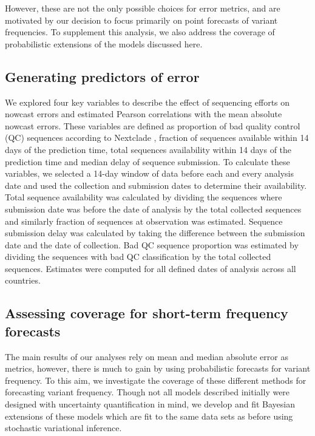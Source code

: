 \documentclass[10pt,letterpaper]{article}
\begin{document}
However, these are not the only possible choices for error metrics, and are motivated by our decision to focus primarily on point forecasts of variant frequencies.
To supplement this analysis, we also address the coverage of probabilistic extensions of the models discussed here.

\subsection*{Generating predictors of error}

We explored four key variables to describe the effect of sequencing efforts on nowcast errors and estimated Pearson correlations with the mean absolute nowcast errors.
These variables are defined as proportion of bad quality control (QC) sequences according to Nextclade \cite{aksamentov2021nextclade}, fraction of sequences available within 14 days of the prediction time, total sequences availability within 14 days of the prediction time and median delay of sequence submission.
To calculate these variables, we selected a 14-day window of data before each and every analysis date and used the collection and submission dates to determine their availability.
Total sequence availability was calculated by dividing the sequences where submission date was before the date of analysis by the total collected sequences and similarly fraction of sequences at observation was estimated.
Sequence submission delay was calculated by taking the difference between the submission date and the date of collection.
Bad QC sequence proportion was estimated by dividing the sequences with bad QC classification by the total collected sequences.
Estimates were computed for all defined dates of analysis across all countries.

\subsection*{Assessing coverage for short-term frequency forecasts}

The main results of our analyses rely on mean and median absolute error as metrics, however, there is much to gain by using probabilistic forecasts for variant frequency.
To this aim, we investigate the coverage of these different methods for forecasting variant frequency.
Though not all models described initially were designed with uncertainty quantification in mind, we develop and fit Bayesian extensions of these models which are fit to the same data sets as before using stochastic variational inference.
\end{document}
